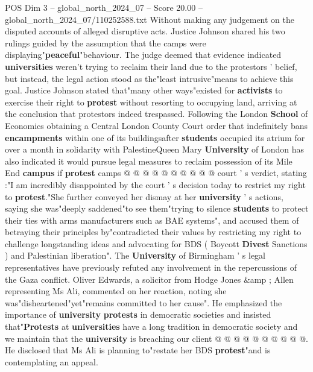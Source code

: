 \begin{textsample}{POS Dim 3 – global\_north\_2024\_07 – Score 20.00 – global\_north\_2024\_07/110252588.txt}
Without making any judgement on the disputed accounts of alleged disruptive acts.
Justice Johnson shared his two rulings guided by the assumption that the camps were displaying"\textbf{peaceful}"behaviour.
The judge deemed that evidence indicated \textbf{universities} weren't trying to reclaim their land due to the protestors ' belief, but instead, the legal action stood as the"least intrusive"means to achieve this goal.
Justice Johnson stated that"many other ways"existed for \textbf{activists} to exercise their right to \textbf{protest} without resorting to occupying land, arriving at the conclusion that protestors indeed trespassed.
Following the London \textbf{School} of Economics obtaining a Central London County Court order that indefinitely bans \textbf{encampments} within one of its buildingsafter \textbf{students} occupied its atrium for over a month in solidarity with PalestineQueen Mary \textbf{University} of London has also indicated it would pursue legal measures to reclaim possession of its Mile End \textbf{campus} if \textbf{protest} camps @ @ @ @ @ @ @ @ @ @ court ' s verdict, stating :"I am incredibly disappointed by the court ' s decision today to restrict my right to \textbf{protest}."She further conveyed her dismay at her \textbf{university} ' s actions, saying she was"deeply saddened"to see them"trying to silence \textbf{students} to protect their ties with arms manufacturers such as BAE systems", and accused them of betraying their principles by"contradicted their values by restricting my right to challenge longstanding ideas and advocating for BDS ( Boycott \textbf{Divest} Sanctions ) and Palestinian liberation".
The \textbf{University} of Birmingham ' s legal representatives have previously refuted any involvement in the repercussions of the Gaza conflict.
Oliver Edwards, a solicitor from Hodge Jones \&amp ; Allen representing Ms Ali, commented on her reaction, noting she was"disheartened"yet"remains committed to her cause".
He emphasized the importance of \textbf{university} \textbf{protests} in democratic societies and insisted that"\textbf{Protests} at \textbf{universities} have a long tradition in democratic society and we maintain that the \textbf{university} is breaching our client @ @ @ @ @ @ @ @ @ @.
He disclosed that Ms Ali is planning to"restate her BDS \textbf{protest}"and is contemplating an appeal.

\end{textsample}
